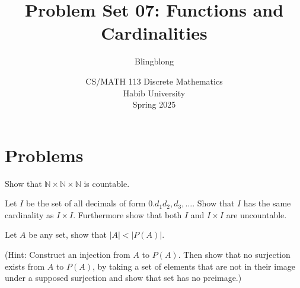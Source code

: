 \documentclass[a4paper]{exam}
\title{Problem Set 07: Functions and Cardinalities}
\author{Blingblong} %
\date{CS/MATH 113 Discrete Mathematics\\Habib University\\Spring 2025}
\begin{document}
\maketitle      


\section*{Problems}
\begin{questions}
    \question Show that $\mathbb{N} \times \mathbb{N} \times \mathbb{N}$ is countable.
    \begin{solution}
    \end{solution}

    \question Let $I$ be the set of all decimals of form $0.d_1d_2,d_3, \dots$. Show that $I$ has the same cardinality as $I \times I$. Furthermore show that both $I$ and $I\times I$ are uncountable.
    \begin{solution}
    \end{solution}

    \question Let $A$ be any set, show that $|A| < |P(A)|$. 
    
    (Hint: Construct an injection from $A$ to $P(A)$. Then show that no surjection exists from $A$ to $P(A)$, by taking a set of elements that are not in their image under a supposed surjection and show that set has no preimage.)
    \begin{solution}
    \end{solution}



\end{questions}
\end{document}
